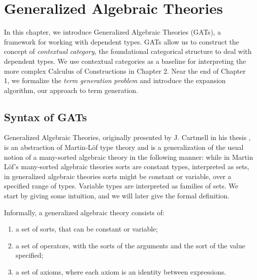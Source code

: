 \chapter{Generalized Algebraic Theories}

In this chapter, we introduce Generalized Algebraic Theories (GATs), a framework for working with 
dependent types. GATs allow us to construct the concept of \textit{contextual category},
the foundational categorical structure to deal with dependent types. We use contextual categories as a baseline 
for interpreting the more complex Calculus of Constructions in Chapter 2.
Near the end of Chapter 1, we formalize the \textit{term generation problem} and introduce the expansion algorithm, our approach to term generation.

\section{Syntax of GATs}

Generalized Algebraic Theories, originally presented by J. Cartmell 
in his thesis \cite{cartmell1978, cartmell1986},
is an abstraction of Martin-L\"of type theory \cite{martin-lof1984}
and is a generalization of the usual notion of a many-sorted 
algebraic theory in the following manner:
while in Martin L{\"o}f's many-sorted algebraic theories sorts
are constant types, interpreted as sets, in generalized
algebraic theories sorts might be constant or variable,
over a specified range of types. Variable types
are interpreted as families of sets. 
We start by giving some intuition, and we will later give the formal definition.

Informally, a generalized
algebraic theory consists of:
\begin{enumerate}
    \item a set of sorts, that can be constant or variable;
    \item a set of operators, with the sorts of the arguments and the sort of the value specified;
    \item a set of axioms, where each axiom is an identity between expressions. 
\end{enumerate}

